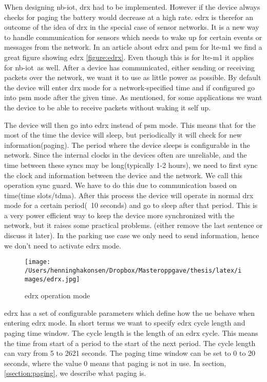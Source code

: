 \documentclass[USenglish]{ifimaster}  %
\begin{document}
When designing \acrshort{nb-iot}, \acrshort{drx} had to be implemented. However if the device always checks for paging the battery would decrease at a high rate. \acrshort{edrx} is therefor an outcome of the idea of \acrshort{drx} in the special case of sensor networks. It is a new way to handle communication for sensors which needs to wake up for certain events or messages from the network. In an article about \acrshort{edrx} and \acrshort{psm} for \acrshort{lte-m1} we find a great figure showing \acrshort{edrx} \vref{figure:edrx}. Even though this is for \acrshort{lte-m1} it applies for \acrshort{nb-iot} as well. After a device has communicated, either sending or receiving packets over the network, we want it to use as little power as possible. By default the device will enter \acrshort{drx} mode for a network-specified time and if configured go into \acrshort{psm} mode after the given time. As mentioned, for some applications we want the device to be able to receive packets without waking it self up.

The device will then go into \acrshort{edrx} instead of \acrshort{psm} mode. This means that for the most of the time the device will sleep, but periodically it will check for new information(paging). The period where the device sleeps is configurable in the network. Since the internal clocks in the devices often are unreliable, and the time between these syncs may be long(typically 1-2 hours), we need to first sync the clock and information between the device and the network. We call this operation sync guard. We have to do this due to communication based on time(time slots/\acrlong{tdma}). After this process the device will operate in normal \acrshort{drx} mode for a certain period(~10 seconds) and go to sleep after that period. This is a very power efficient way to keep the device more synchronized with the network, but it raises some practical problems. (either remove the last sentence or discuss it later). In the parking use case we only need to send information, hence we don't need to activate \acrshort{edrx} mode.

\begin{figure}[ht]
  \centering\texttt{[image: /Users/henninghakonsen/Dropbox/Masteroppgave/thesis/latex/images/edrx.jpg]}
  \caption{\acrshort{edrx} operation mode \cite{online:edrxpsm}}
  \label{figure:edrx}
\end{figure}

\acrshort{edrx} has a set of configurable parameters which define how the \acrshort{ue} behave when entering \acrshort{edrx} mode. In short terms we want to specify \acrshort{edrx} cycle length and paging time window. The cycle length is the length of an \acrshort{edrx} cycle. This means the time from start of a period to the start of the next period. The cycle length can vary from 5 to 2621 seconds. The paging time window can be set to 0 to 20 seconds, where the value 0 means that paging is not in use. In section, \vref{ssection:paging}, we describe what paging is.
\end{document}
